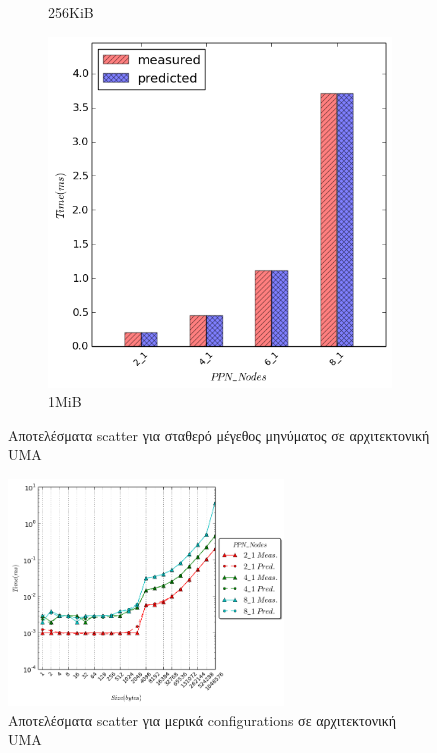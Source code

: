 \begin{figure}[H]
\begin{subfigure}[b]{0.45\textwidth}
        \caption{256KiB}
    \end{subfigure}
    \quad
        \begin{subfigure}[b]{0.45\textwidth}
        \includegraphics[width=\textwidth]{./images/scatter/scatter_1048576}
        \caption{1MiB}
    \end{subfigure}

    \caption{Αποτελέσματα scatter για σταθερό μέγεθος μηνύματος σε αρχιτεκτονική UMA}
        \label{fig:scatter_sizes}
\end{figure}
\begin{figure}[H]
    \centering
    \includegraphics[width=0.65\textwidth]{./images/scatter/scatter.png}
    \caption{Αποτελέσματα scatter για μερικά configurations σε αρχιτεκτονική UMA}
    \label{fig:scatter_conf}
\end{figure}


